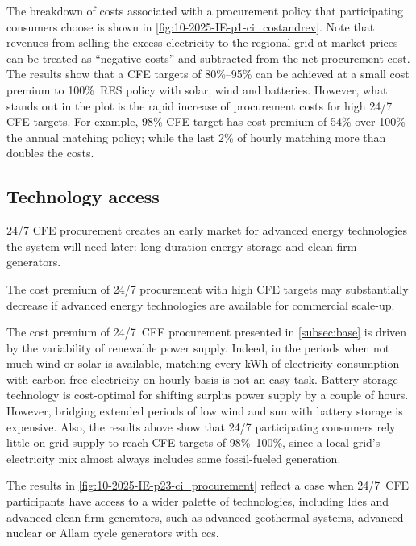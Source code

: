 The breakdown of costs associated with a procurement policy that participating consumers choose is shown in \cref{fig:10-2025-IE-p1-ci_costandrev}.
Note that revenues from selling the excess electricity to the regional grid at market prices can be treated as \enquote{negative costs} and subtracted from the net procurement cost.
The results show that a CFE targets of 80\%--95\% can be achieved at a small cost premium to 100\%~RES policy with solar, wind and batteries.
However, what stands out in the plot is the rapid increase of procurement costs for high 24/7 CFE targets. 
For example, 98\% CFE target has cost premium of 54\% over 100\% the annual matching policy; while the last 2\% of hourly matching more than doubles the costs.


\subsection{Technology access}
\label{subsec:palette}

\begin{res}
    24/7 CFE procurement creates an early market for advanced energy technologies the system will need later: long-duration energy storage and clean firm generators.
\end{res}

\begin{res}
    The cost premium of 24/7 procurement with high CFE targets may substantially decrease if advanced energy technologies are available for commercial scale-up. 
\end{res}

The cost premium of 24/7~CFE procurement presented in \cref{subsec:base} is driven by the variability of renewable power supply.
Indeed, in the periods when not much wind or solar is available, matching every kWh of electricity consumption with carbon-free electricity on hourly basis is not an easy task.
Battery storage technology is cost-optimal for shifting surplus power supply by a couple of hours.
However, bridging extended periods of low wind and sun with battery storage is expensive.
Also, the results above show that 24/7 participating consumers rely little on grid supply to reach CFE targets of 98\%--100\%, since a local grid's electricity mix almost always includes some fossil-fueled generation.

The results in \cref{fig:10-2025-IE-p23-ci_procurement} reflect a case when 24/7~CFE participants have access to a wider palette of technologies, including \gls{ldes} and advanced clean firm generators, such as advanced geothermal systems, advanced nuclear or Allam cycle generators with \gls{ccs}.


